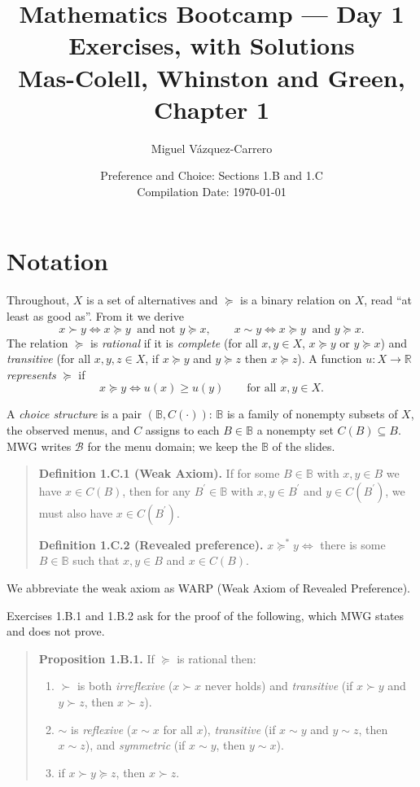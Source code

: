 \documentclass[12pt]{article}
\title{\textbf{Mathematics Bootcamp --- Day 1 Exercises, with Solutions}\\[.4em]
       \large Mas-Colell, Whinston and Green, Chapter 1}
\author{Miguel V\'azquez-Carrero}
\date{Preference and Choice: Sections 1.B and 1.C\\[.3em]
      \normalsize Compilation Date: \today}
\begin{document}
\maketitle

\section*{Notation}

Throughout, $X$ is a set of alternatives and $\succeq$ is a binary relation on
$X$, read ``at least as good as''. From it we derive
\[
x\succ y \iff x\succeq y \ \text{ and not } y\succeq x,
\qquad
x\sim y \iff x\succeq y \ \text{ and } y\succeq x .
\]
The relation $\succeq$ is \emph{rational} if it is
\emph{complete} (for all $x,y\in X$, $x\succeq y$ or $y\succeq x$)
and \emph{transitive} (for all $x,y,z\in X$, if $x\succeq y$ and $y\succeq z$
then $x\succeq z$). A function $u:X\to\mathbb R$ \emph{represents} $\succeq$ if
\[
x\succeq y \iff u(x)\geq u(y)\qquad\text{for all }x,y\in X .
\]

A \emph{choice structure} is a pair $(\mathbb B,C(\cdot))$: $\mathbb B$ is a
family of nonempty subsets of $X$, the observed menus, and $C$ assigns to each
$B\in\mathbb B$ a nonempty set $C(B)\subseteq B$. MWG writes $\mathcal B$ for
the menu domain; we keep the $\mathbb B$ of the slides.

\begin{quote}
  \textbf{Definition 1.C.1 (Weak Axiom).}
  If for some $B\in\mathbb B$ with $x,y\in B$ we have $x\in C(B)$, then for any
  $B^{\prime}\in\mathbb B$ with $x,y\in B^{\prime}$ and $y\in C(B^{\prime})$, we
  must also have $x\in C(B^{\prime})$.

  \medskip
  \textbf{Definition 1.C.2 (Revealed preference).}
  $x\succeq^{*}y \iff$ there is some $B\in\mathbb B$ such that $x,y\in B$ and
  $x\in C(B)$.
\end{quote}

We abbreviate the weak axiom as WARP (Weak Axiom of Revealed Preference).

Exercises 1.B.1 and 1.B.2 ask for the proof of the following, which MWG states
and does not prove.

\begin{quote}
  \textbf{Proposition 1.B.1.} If $\succeq$ is rational then:
  \begin{enumerate}[label=(\roman*),leftmargin=2.4em,topsep=.3em,itemsep=.2em]
    \item $\succ$ is both \emph{irreflexive} ($x\succ x$ never holds) and
    \emph{transitive} (if $x\succ y$ and $y\succ z$, then $x\succ z$).
    \item $\sim$ is \emph{reflexive} ($x\sim x$ for all $x$), \emph{transitive}
    (if $x\sim y$ and $y\sim z$, then $x\sim z$), and \emph{symmetric}
    (if $x\sim y$, then $y\sim x$).
    \item if $x\succ y\succeq z$, then $x\succ z$.
  \end{enumerate}
\end{quote}
\end{document}
